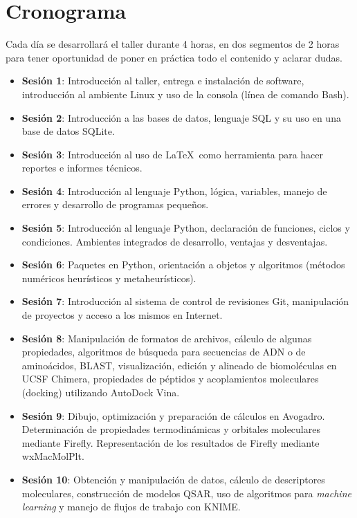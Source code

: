 \documentclass[10pt,letterpaper]{article}
\begin{document}
\section{Cronograma}
Cada d\'ia se desarrollar\'a el taller durante 4 horas, en dos segmentos de 2 horas para tener oportunidad de poner en pr\'actica todo el contenido y aclarar dudas.

\begin{itemize}
\item \textbf{Sesi\'on 1}: Introducci\'on al taller, entrega e instalaci\'on de software, introducci\'on al ambiente Linux y uso de la consola (l\'inea de comando Bash).
\item \textbf{Sesi\'on 2}: Introducci\'on a las bases de datos, lenguaje SQL y su uso en una base de datos SQLite.
\item \textbf{Sesi\'on 3}: Introducci\'on al uso de \LaTeX\ como herramienta para hacer reportes e informes t\'ecnicos.
\item \textbf{Sesi\'on 4}: Introducci\'on al lenguaje Python, l\'ogica, variables, manejo de errores y desarrollo de programas peque\~nos.
\item \textbf{Sesi\'on 5}: Introducci\'on al lenguaje Python, declaraci\'on de funciones, ciclos y condiciones. Ambientes integrados de desarrollo, ventajas y desventajas.
\item \textbf{Sesi\'on 6}: Paquetes en Python, orientaci\'on a objetos y algoritmos (m\'etodos num\'ericos heur\'isticos y metaheur\'isticos).
\item \textbf{Sesi\'on 7}: Introducci\'on al sistema de control de revisiones Git, manipulaci\'on de proyectos y acceso a los mismos en Internet.
\item \textbf{Sesi\'on 8}: Manipulaci\'on de formatos de archivos, c\'alculo de algunas propiedades, algoritmos de b\'usqueda para secuencias de ADN o de amino\'acidos, BLAST, visualizaci\'on, edici\'on y alineado de biomol\'eculas en UCSF Chimera, propiedades de p\'eptidos y acoplamientos moleculares (docking) utilizando AutoDock Vina.
\item \textbf{Sesi\'on 9}: Dibujo, optimizaci\'on y preparaci\'on de c\'alculos en Avogadro. Determinaci\'on de propiedades termodin\'amicas y orbitales moleculares mediante Firefly. Representaci\'on de los resultados de Firefly mediante wxMacMolPlt.
\item \textbf{Sesi\'on 10}: Obtenci\'on y manipulaci\'on de datos, c\'alculo de descriptores moleculares, construcci\'on de modelos QSAR, uso de algoritmos para \emph{machine learning} y manejo de flujos de trabajo con KNIME.

\end{itemize}
\end{document}
